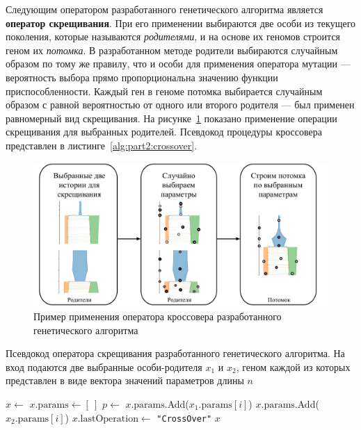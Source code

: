 \FloatBarrier

Следующим оператором разработанного генетического алгоритма является \textbf{оператор скрещивания}.
При его применении выбираются две особи из текущего поколения, которые называются \textit{родителями}, и на основе их геномов строится геном их \textit{потомка}.
В разработанном методе родители выбираются случайным образом по тому же правилу, что и особи для применения оператора мутации --- вероятность выбора прямо пропорциональна значению функции приспособленности.
Каждый ген в геноме потомка выбирается случайным образом с равной вероятностью от одного или второго родителя --- был применен равномерный вид скрещивания.
На рисунке~\ref{fig:part2:crossover} показано применение операции скрещивания для выбранных родителей.
Псевдокод процедуры кроссовера представлен в листинге~\ref{alg:part2:crossover}.

\begin{figure}[ht]
  \centering
   \includegraphics[width=\linewidth]{images/part2/genetics_algorithm/Cross_rus.pdf}
  \caption{Пример применения оператора кроссовера разработанного генетического алгоритма}
  \label{fig:part2:crossover}
\end{figure}

\begin{algorithm}
\caption{Псевдокод оператора скрещивания разработанного генетического алгоритма. На вход подаются две выбранные особи-родителя $x_1$ и $x_2$, геном каждой из которых представлен в виде вектора значений параметров длины $n$}
\label{alg:part2:crossover}
\begin{algorithmic}[1]
\State $x \leftarrow $ 
\State $x.\text{params} \leftarrow [\ ]$ 
 
    \State $p \leftarrow$ 
        \State $x.\text{params}$.Add($x_1.\text{params}[i]$)
    \Else {}
        \State $x.\text{params}$.Add($x_2.\text{params}[i]$)
    \EndIf
\EndFor
\State $x.\text{lastOperation} \leftarrow$ \texttt{"CrossOver"}
\State \Return $x$
\EndFunction
\end{algorithmic}
\end{algorithm}

